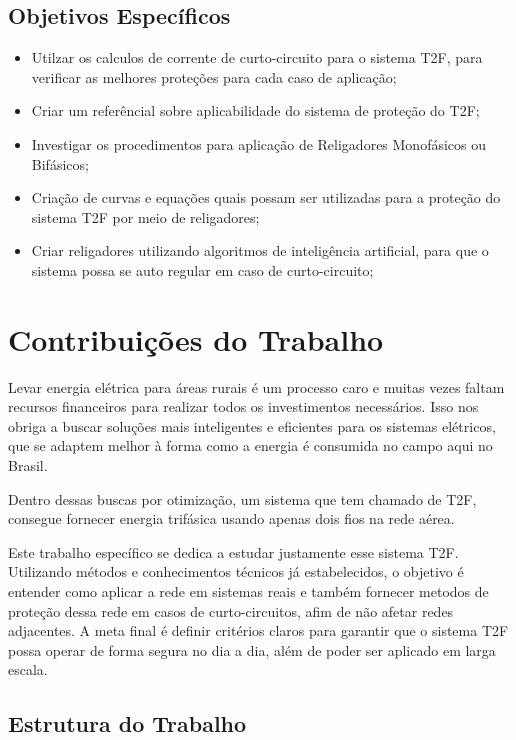 \documentclass[oneside,openright,12pt]{ufsm_2021} %
\begin{document}
\subsection{Objetivos Específicos}
\begin{itemize}
	\item Utilzar os calculos de corrente de curto-circuito para o sistema T2F, para verificar as melhores proteções para cada caso de aplicação;
	\item Criar um referêncial sobre aplicabilidade do sistema de proteção do T2F;
	\item Investigar os procedimentos para aplicação de Religadores Monofásicos ou Bifásicos;
	\item Criação de curvas e equações quais possam ser utilizadas para a proteção do sistema T2F por meio de religadores;
	\item Criar religadores utilizando algoritmos de inteligência artificial, para que o sistema possa se auto regular em caso de curto-circuito;
\end{itemize}

\section{Contribuições do Trabalho}
\par Levar energia elétrica para áreas rurais é um processo caro e muitas vezes faltam recursos financeiros para realizar todos os investimentos necessários. Isso nos obriga a buscar soluções mais inteligentes e eficientes para os sistemas elétricos, que se adaptem melhor à forma como a energia é consumida no campo aqui no Brasil.

\par Dentro dessas buscas por otimização, um sistema que tem chamado de T2F, consegue fornecer energia trifásica usando apenas dois fios na rede aérea.

\par Este trabalho específico se dedica a estudar justamente esse sistema T2F. Utilizando métodos e conhecimentos técnicos já estabelecidos, o objetivo é entender como aplicar a rede em sistemas reais e também fornecer metodos de proteção dessa rede em casos de curto-circuitos, afim de não afetar redes adjacentes. A meta final é definir critérios claros para garantir que o sistema T2F possa operar de forma segura no dia a dia, além de poder ser aplicado em larga escala.

\subsection{Estrutura do Trabalho}
\end{document}
